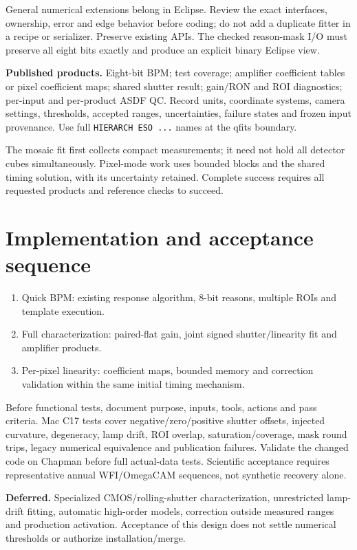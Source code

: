 \documentclass[11pt,a4paper]{article}
\newcommand{\key}[1]{\textbf{\color{ink}#1}}
\begin{document}
General numerical extensions belong in Eclipse. Review the exact interfaces, ownership, error and edge behavior before coding; do not add a duplicate fitter in a recipe or serializer. Preserve existing APIs. The checked reason-mask I/O must preserve all eight bits exactly and produce an explicit binary Eclipse view.

\key{Published products.} Eight-bit BPM; test coverage; amplifier coefficient tables or pixel coefficient maps; shared shutter result; gain/RON and ROI diagnostics; per-input and per-product ASDF QC. Record units, coordinate systems, camera settings, thresholds, accepted ranges, uncertainties, failure states and frozen input provenance. Use full \texttt{HIERARCH ESO ...} names at the qfits boundary.

The mosaic fit first collects compact measurements; it need not hold all detector cubes simultaneously. Pixel-mode work uses bounded blocks and the shared timing solution, with its uncertainty retained. Complete success requires all requested products and reference checks to succeed.

\section{Implementation and acceptance sequence}
\begin{enumerate}
\item Quick BPM: existing response algorithm, 8-bit reasons, multiple ROIs and template execution.
\item Full characterization: paired-flat gain, joint signed shutter/linearity fit and amplifier products.
\item Per-pixel linearity: coefficient maps, bounded memory and correction validation within the same initial timing mechanism.
\end{enumerate}
Before functional tests, document purpose, inputs, tools, actions and pass criteria. Mac C17 tests cover negative/zero/positive shutter offsets, injected curvature, degeneracy, lamp drift, ROI overlap, saturation/coverage, mask round trips, legacy numerical equivalence and publication failures. Validate the changed code on Chapman before full actual-data tests. Scientific acceptance requires representative annual WFI/OmegaCAM sequences, not synthetic recovery alone.

\key{Deferred.} Specialized CMOS/rolling-shutter characterization, unrestricted lamp-drift fitting, automatic high-order models, correction outside measured ranges and production activation. Acceptance of this design does not settle numerical thresholds or authorize installation/merge.
\end{document}
